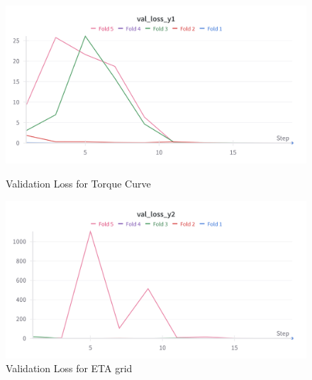 \documentclass{report} %
\begin{document}
\begin{figure}[h]
    \centering
    \begin{minipage}[b]{0.3\textwidth}
        \includegraphics[width=\textwidth]{./ReportImages/val_loss_y1.png}
        \caption{Validation Loss for Torque Curve}
        \label{fig:Validation Loss for Torque Curve}
    \end{minipage}
    \hfill
    \begin{minipage}[b]{0.3\textwidth}
        \includegraphics[width=\textwidth]{./ReportImages/val_loss_y2.png}
        \caption{Validation Loss for ETA grid}
        \label{fig:Validation Loss for ETA grid}
    \end{minipage}
\end{figure}
\end{document}
